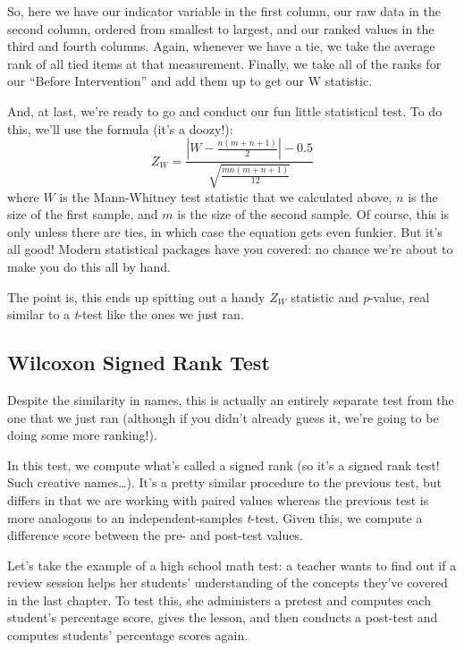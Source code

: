 So, here we have our indicator variable in the first column, our raw data in the second column, ordered from smallest to largest, and our ranked values in the third and fourth columns. Again, whenever we have a tie, we take the average rank of all tied items at that measurement. Finally, we take all of the ranks for our ``Before Intervention'' and add them up to get our W statistic.

And, at last, we're ready to go and conduct our fun little statistical test. To do this, we'll use the formula (it's a doozy!):
\begin{equation}
Z_W = \frac{\left|W-\frac{n(m+n+1)}{2}\right|-0.5}{\sqrt{\frac{mn(m+n+1)}{12}}}
\end{equation}
where $W$ is the Mann-Whitney test statistic that we calculated above, $n$ is the size of the first sample, and $m$ is the size of the second sample. Of course, this is only unless there are ties, in which case the equation gets even funkier. But it's all good! Modern statistical packages have you covered: no chance we're about to make you do this all by hand.

The point is, this ends up spitting out a handy $Z_W$ statistic and \textit{p}-value, real similar to a \textit{t}-test like the ones we just ran.

\subsection{Wilcoxon Signed Rank Test}

Despite the similarity in names, this is actually an entirely separate test from the one that we just ran (although if you didn't already guess it, we're going to be doing some more ranking!).

In this test, we compute what's called a signed rank (so it's a signed rank test! Such creative names\ldots). It's a pretty similar procedure to the previous test, but differs in that we are working with paired values whereas the previous test is more analogous to an independent-samples \textit{t}-test. Given this, we compute a difference score between the pre- and post-test values.

Let's take the example of a high school math test: a teacher wants to find out if a review session helps her students' understanding of the concepts they've covered in the last chapter. To test this, she administers a pretest and computes each student's percentage score, gives the lesson, and then conducts a post-test and computes students' percentage scores again.

